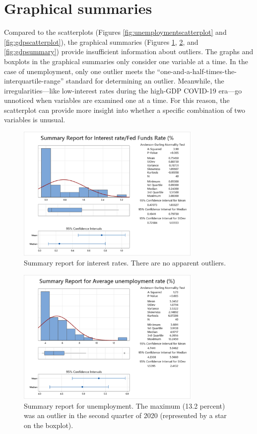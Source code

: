 \documentclass[12pt]{article}
\begin{document}
\section{Graphical summaries}
Compared to the scatterplots (Figures \ref{fig:unemploymentscatterplot} and \ref{fig:gdpscatterplot}), the graphical summaries (Figures \ref{fig:interestratesummary}, \ref{fig:unemploymentsummary}, and \ref{fig:gdpsummary}) provide insufficient information about outliers. The graphs and boxplots in the graphical summaries only consider one variable at a time. In the case of unemployment, only one outlier meets the ``one-and-a-half-times-the-interquartile-range'' standard for determining an outlier. Meanwhile, the irregularities---like low-interest rates during the high-GDP COVID-19 era---go unnoticed when variables are examined one at a time. For this reason, the scatterplot can provide more insight into whether a specific combination of two variables is unusual.
\begin{figure}[ht]
\begin{center}
\includegraphics[width=3.5in]{images/interest-rate-summary.png}
\end{center}
\caption{Summary report for interest rates. There are no apparent outliers.\label{fig:interestratesummary}}
\end{figure}
\begin{figure}
\begin{center}
\includegraphics[width=3.5in]{images/unemployment-summary.png}
\end{center}
\caption{Summary report for unemployment. The maximum (13.2 percent) was an outlier in the second quarter of 2020 (represented by a star on the boxplot).\label{fig:unemploymentsummary}}
\end{figure}
\end{document}
